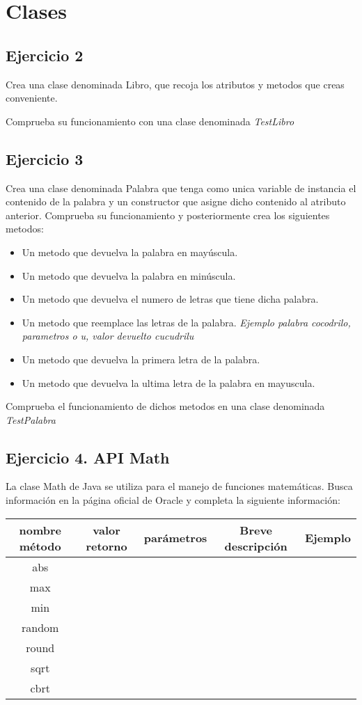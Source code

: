 \documentclass[4paper]{article}
\begin{document}
\section{Clases}
\subsection{Ejercicio 2}
Crea una clase denominada Libro, que recoja los atributos y metodos que creas conveniente.\par 
Comprueba su funcionamiento con una clase denominada \emph{TestLibro}



\subsection{Ejercicio 3}
Crea una clase denominada Palabra que tenga como unica variable de instancia el contenido de la palabra y un constructor que asigne dicho contenido al atributo anterior. Comprueba su funcionamiento y posteriormente crea los siguientes metodos:
\begin{itemize}
\item Un metodo que devuelva la palabra en mayúscula.
\item Un metodo que devuelva la palabra en minúscula.
\item Un metodo que devuelva el numero de letras que tiene dicha palabra.
\item Un metodo que reemplace las letras de la palabra. \emph{Ejemplo palabra cocodrilo, parametros \emph{o u}, valor devuelto cucudrilu}
\item Un metodo que devuelva la primera letra de la palabra.
\item Un metodo que devuelva la ultima letra de la palabra en mayuscula.
\end{itemize} 
Comprueba el funcionamiento de dichos metodos en una clase denominada \emph{TestPalabra}

\subsection{Ejercicio 4. API Math}
La clase Math de Java se utiliza para el manejo de funciones matemáticas. Busca información en la página oficial de Oracle y completa la siguiente información:\par
\vspace{0,5cm}
\begin{tabular}{|c|c|c|c|c|}
\hline
\bf{nombre método} & \bf{valor retorno} & \bf{parámetros} & \bf{Breve descripción} & \bf{Ejemplo} \\
\hline
abs & &  &  &  \\
\hline
max &  &  & &  \\
\hline
min &  &  & &  \\
\hline
random &  &  & &  \\
\hline
round &  &  & &  \\
\hline
sqrt &  &  & &  \\
\hline
cbrt &  &  & &  \\
\hline
\end{tabular}
\end{document}
